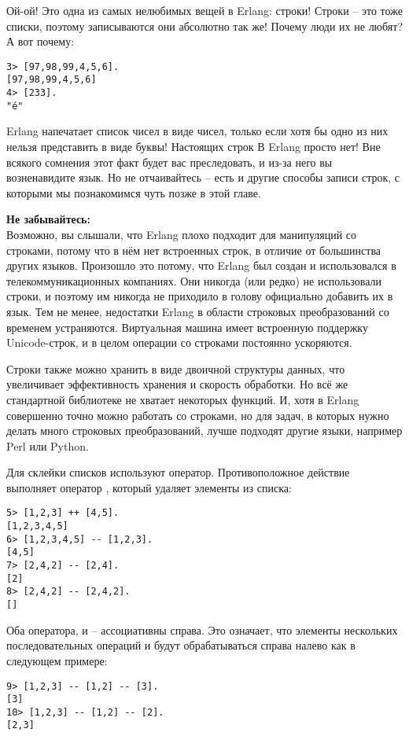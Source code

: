 Ой\--ой! Это одна из самых нелюбимых вещей в Erlang: строки! Строки \--- это тоже списки, поэтому записываются они абсолютно так же! Почему люди их не любят? А вот почему:
\begin{lstlisting}[style=repl]
3> [97,98,99,4,5,6].
[97,98,99,4,5,6]
4> [233].
"é"
\end{lstlisting}

Erlang напечатает список чисел в виде чисел, только если хотя бы одно из них нельзя представить в виде буквы! Настоящих строк В Erlang просто нет! Вне всякого сомнения этот факт будет вас преследовать, и из\--за него вы возненавидите язык. Но не отчаивайтесь \--- есть и другие способы записи строк, с которыми мы познакомимся чуть позже в этой главе.\\ 
\colorbox{lorange}
{
    \begin{minipage}{1.0\linewidth}
        \textbf{Не забывайтесь:}\\ 
        Возможно, вы слышали, что Erlang плохо подходит для манипуляций со строками, потому что в нём нет встроенных строк, в отличие от большинства других языков. Произошло это потому, что Erlang был создан и использовался в телекоммуникационных компаниях. Они никогда (или редко) не использовали строки, и поэтому им никогда не приходило в голову официально добавить их в язык. Тем не менее, недостатки Erlang в области строковых преобразований со временем устраняются. Виртуальная машина имеет встроенную поддержку Unicode\--строк, и в целом операции со строками постоянно ускоряются.
        
        Строки также можно хранить в виде двоичной структуры данных, что увеличивает эффективность хранения и скорость обработки. Но всё же стандартной библиотеке не хватает некоторых функций. И, хотя в Erlang совершенно точно можно работать со строками, но для задач, в которых нужно делать много строковых преобразований, лучше подходят другие языки, например Perl или Python.
    \end{minipage}
}

Для склейки списков используют оператор\ops{++}. Противоположное действие выполняет оператор \ops{$--$}, который удаляет элементы из списка:
\begin{lstlisting}[style=repl]
5> [1,2,3] ++ [4,5].
[1,2,3,4,5]
6> [1,2,3,4,5] -- [1,2,3].
[4,5]
7> [2,4,2] -- [2,4].
[2]
8> [2,4,2] -- [2,4,2].
[]
\end{lstlisting}

Оба оператора, \ops{++} и \ops{$--$} \--- ассоциативны справа. Это означает, что элементы нескольких последовательных операций \ops{++} и \ops{$--$} будут обрабатываться справа налево как в следующем примере:
\begin{lstlisting}[style=repl]
9> [1,2,3] -- [1,2] -- [3].
[3]
10> [1,2,3] -- [1,2] -- [2].
[2,3]
\end{lstlisting}

